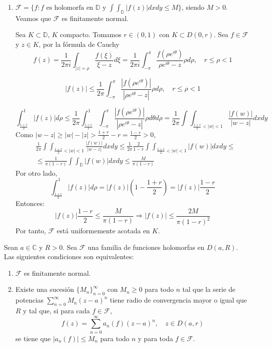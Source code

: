 \begin{example}
\begin{enumerate}
        \item $\mathcal{F} = \{f : f \text{ es holomorfa en } \mathbb{D} \text{ y } \int\int_\mathbb{D} |f(z)|dxdy \leq M\}$, siendo $M > 0$.
              Veamos que $\mathcal{F}$ es finitamente normal.

              Sea $K \subset \mathbb{D}$, $K$ compacto.
              Tomamos $r \in (0, 1)$ con $K \subset D(0, r)$.
              Sea $f \in \mathcal{F}$ y $z \in K$, por la fórmula de Cauchy
              $$f(z) = \frac{1}{2\pi i} \int_{|z| = \rho} \frac{f(\xi)}{\xi-z}d\xi = \frac{1}{2\pi i} \int_{-\pi}^\pi \frac{f(\rho e^{i\theta})}{\rho e^{i\theta} - z}\rho d\rho, \quad r \leq \rho < 1$$

              $$|f(z)| \leq \frac{1}{2\pi} \int_{-\pi}^\pi \frac{|f(\rho e^{i\theta})|}{|\rho e^{i\theta} - z|}\rho d\rho, \quad r \leq \rho < 1$$

              $$\int_{\frac{1+r}{2}}^1 |f(z)|d\rho \leq \frac{1}{2\pi} \int_{\frac{1+r}{2}}^1 \int_{-\pi}^\pi \frac{|f(\rho e^{i\theta})|}{|\rho e^{i\theta} - z|}\rho d\theta d\rho = \frac{1}{2\pi} \int\int_{\frac{1+r}{2} < |w| < 1} \frac{|f(w)|}{|w-z|}dxdy$$
              Como $|w-z| \geq |w| - |z| > \frac{1+r}{2}-r = \frac{1-r}{2} > 0$,
              \begin{align*}
                   & \frac{1}{2\pi} \int\int_{\frac{1+r}{2} < |w| < 1} \frac{|f(w)|}{|w-z|}dxdy \leq \frac{1}{2\pi} \frac{2}{1-r} \int\int_{\frac{1+r}{2} < |w| < 1} |f(w)| dxdy \leq \\
                   & \leq \frac{1}{\pi(1-r)} \int\int_\mathbb{D} |f(w)|dxdy \leq \frac{M}{\pi(1-r)}
              \end{align*}
              Por otro lado,
              $$\int_{\frac{1+r}{2}}^1 |f(z)|d\rho = |f(z)|\left(1 - \frac{1+r}{2}\right) = |f(z)|\frac{1-r}{2}$$
              Entonces:
              $$|f(z)|\frac{1-r}{2} \leq \frac{M}{\pi(1-r)} \Rightarrow |f(z)| \leq \frac{2M}{\pi(1-r)^2}$$
              Por tanto, $\mathcal{F}$ está uniformemente acotada en $K$.
    \end{enumerate}
\end{example}

\begin{theorem}
    Sean $a \in \mathbb{C}$ y $R > 0$.
    Sea $\mathcal{F}$ una familia de funciones holomorfas en $D(a, R)$.
    Las siguientes condiciones son equivalentes:
    \begin{enumerate}
        \item $\mathcal{F}$ es finitamente normal.
        \item Existe una sucesión $\{M_n\}_{n=0}^\infty$ con $M_n \geq 0$ para todo $n$ tal que la serie de potencias $\sum_{n=0}^\infty M_n(z-a)^n$ tiene radio de convergencia mayor o igual que $R$ y tal que, si para cada $f \in \mathcal{F}$,
              $$f(z) = \sum_{n=0}^\infty a_n(f)(z-a)^n, \quad z \in D(a, r)$$
              se tiene que $|a_n(f)| \leq M_n$ para todo $n$ y para toda $f \in \mathcal{F}$.
    \end{enumerate}
\end{theorem}

